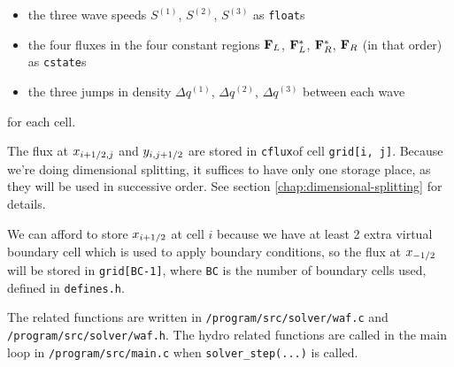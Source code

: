 \begin{itemize}
	\item the three wave speeds $S^{(1)}$, $S^{(2)}$, $S^{(3)}$ as \texttt{float}s
	\item the four fluxes in the four constant regions $\mathbf{F}_L$, $\mathbf{F}_L^*$, $\mathbf{F}_R^*$, $\mathbf{F}_R$ (in that order) as \texttt{cstate}s
	\item the three jumps in density $\Delta q^{(1)}$, $\Delta q^{(2)}$, $\Delta q^{(3)}$ between each wave
\end{itemize}

for each cell.


The flux at $x_{i+1/2, j}$ and $y_{i, j+1/2}$ are stored in \texttt{cflux}of cell \verb|grid[i, j]|.
Because we're doing dimensional splitting, it suffices to have only one storage place, as they will be used in successive order.
See section \ref{chap:dimensional-splitting} for details.

We can afford to store $x_{i+1/2}$ at cell $i$ because we have at least 2 extra virtual boundary cell which is used to apply boundary conditions, so the flux at $x_{-1/2}$ will be stored in \verb|grid[BC-1]|, where \texttt{BC} is the number of boundary cells used, defined in \texttt{defines.h}.
 



The related functions are written in \texttt{/program/src/solver/waf.c} and \texttt{/program/src/solver/waf.h}.
The hydro related functions are called in the main loop in \texttt{/program/src/main.c} when \verb|solver_step(...)| is called.

